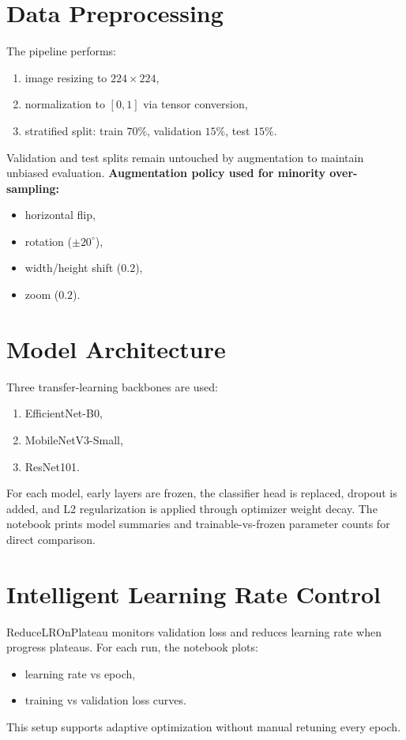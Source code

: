 \documentclass[12pt,a4paper]{article}
\begin{document}
\section{Data Preprocessing}
The pipeline performs:
\begin{enumerate}[noitemsep]
    \item image resizing to $224\times224$,
    \item normalization to $[0,1]$ via tensor conversion,
    \item stratified split: train $70\%$, validation $15\%$, test $15\%$.
\end{enumerate}
Validation and test splits remain untouched by augmentation to maintain unbiased evaluation.
\textbf{Augmentation policy used for minority over-sampling:}
\begin{itemize}[noitemsep]
    \item horizontal flip,
    \item rotation ($\pm 20^\circ$),
    \item width/height shift ($0.2$),
    \item zoom ($0.2$).
\end{itemize}

\section{Model Architecture}
Three transfer-learning backbones are used:
\begin{enumerate}[noitemsep]
    \item EfficientNet-B0,
    \item MobileNetV3-Small,
    \item ResNet101.
\end{enumerate}
For each model, early layers are frozen, the classifier head is replaced, dropout is added, and L2 regularization is applied through optimizer weight decay. The notebook prints model summaries and trainable-vs-frozen parameter counts for direct comparison.

\section{Intelligent Learning Rate Control}
ReduceLROnPlateau monitors validation loss and reduces learning rate when progress plateaus. For each run, the notebook plots:
\begin{itemize}[noitemsep]
    \item learning rate vs epoch,
    \item training vs validation loss curves.
\end{itemize}
This setup supports adaptive optimization without manual retuning every epoch.
\end{document}
